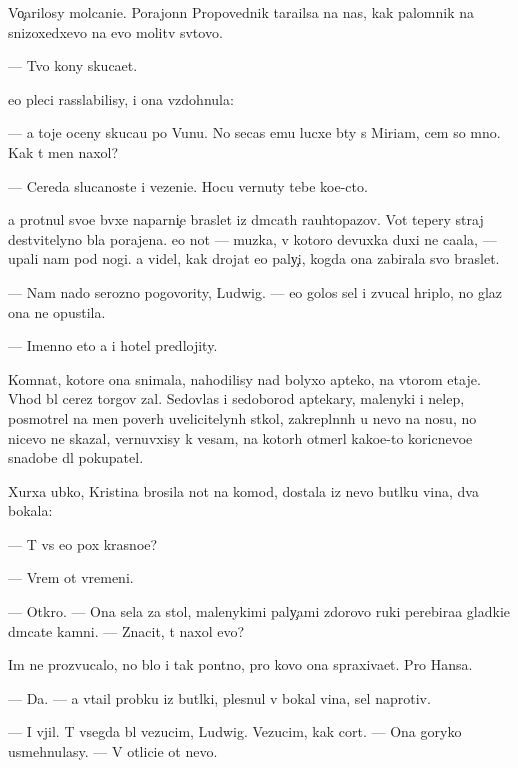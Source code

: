 \documentclass[10pt]{book}
\begin{document}
Vo{\c}arilosy molcani{\y}e. Porajonn{\yi}{\y} Propovednik tara{\x}ilsa na nas, kak palomnik na snizoxedxevo na {\y}evo molitv{\yi} sv{\ia}tovo.

— Tvo{\y} kony skuca{\y}et.

{\Y}e{\y}o pleci rasslabilisy, i ona vzdohnula:

— {\Y}a toje oceny skuca{\y}u po V{\y}unu. No se{\y}cas {\y}emu lucxe b{\yi}ty s Miriam, cem so mno{\y}. Kak t{\yi} men{\ia} naxol?

— Cereda sluca{\y}noste{\y} i vezeni{\y}e. Hocu vernuty tebe ko{\y}e-cto.

{\Y}a prot{\ia}nul svo{\y}e{\y} b{\yi}vxe{\y} naparni{\c}e braslet iz d{\yi}mcat{\yi}h rauhtopazov. Vot tepery straj de{\y}stvitelyno b{\yi}la porajena. {\Y}e{\y}o not{\yi} — muz{\yi}ka, v kotoro{\y} devuxka duxi ne ca{\y}ala, — upali nam pod nogi. {\Y}a videl, kak drojat {\y}e{\y}o paly{\c}i, kogda ona zabirala svo{\y} braslet.

— Nam nado ser{\y}ozno pogovority, Ludwig. — {\Y}e{\y}o golos sel i zvucal hriplo, no glaz ona ne opustila.

— Imenno eto {\y}a i hotel predlojity.



Komnat{\yi}, kotor{\yi}{\y}e ona snimala, nahodilisy nad bolyxo{\y} apteko{\y}, na vtorom etaje. Vhod b{\yi}l cerez torgov{\yi}{\y} zal. Sedovlas{\yi}{\y} i sedoborod{\yi}{\y} aptekary, malenyki{\y} i nelep{\yi}{\y}, posmotrel na men{\ia} poverh uvelicitelyn{\yi}h st{\e}kol, zakrepl{\e}nn{\yi}h u nevo na nosu, no nicevo ne skazal, vernuvxisy k vesam, na kotor{\yi}h otmer{\ia}l kako{\y}e-to koricnevo{\y}e snadob{\y}e dl{\ia} pokupatel{\ia}.

Xurxa {\y}ubko{\y}, Kristina brosila not{\yi} na komod, dostala iz nevo but{\yi}lku vina, dva bokala:

— T{\yi} vs{\e} {\y}e{\x}o p{\y}ox krasno{\y}e?

— Vrem{\ia} ot vremeni.

— Otkro{\y}. — Ona sela za stol, malenykimi paly{\c}ami zdorovo{\y} ruki perebira{\y}a gladki{\y}e d{\yi}mcat{\yi}{\y}e kamni. — Znacit, t{\yi} naxol {\y}evo?

Im{\ia} ne prozvucalo, no b{\yi}lo i tak pon{\ia}tno, pro kovo ona spraxiva{\y}et. Pro Hansa.

— Da. — {\Y}a v{\yi}ta{\x}il probku iz but{\yi}lki, plesnul v bokal{\yi} vina, sel naprotiv.

— I v{\yi}jil. T{\yi} vsegda b{\yi}l vezucim, Ludwig. Vezucim, kak cort. — Ona goryko usmehnulasy. — V otlici{\y}e ot nevo.
\end{document}
